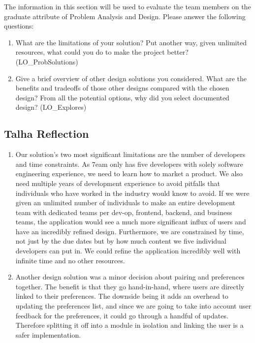 \documentclass[12pt, titlepage]{article}
\begin{document}
The information in this section will be used to evaluate the team members on the
graduate attribute of Problem Analysis and Design.  Please answer the following questions:

\begin{enumerate}
  \item What are the limitations of your solution?  Put another way, given
  unlimited resources, what could you do to make the project better? (LO\_ProbSolutions)
  \item Give a brief overview of other design solutions you considered.  What
  are the benefits and tradeoffs of those other designs compared with the chosen
  design?  From all the potential options, why did you select documented design?
  (LO\_Explores)
\end{enumerate}

\subsection{Talha Reflection}
\begin{enumerate}
	\item Our solution's two most significant limitations are the number of developers and time constraints. As 7eam only has five developers with solely software engineering experience, we need to learn how to market a product. We also need multiple years of development experience to avoid pitfalls that individuals who have worked in the industry would know to avoid. If we were given an unlimited number of individuals to make an entire development team with dedicated teams per dev-op, frontend, backend, and business teams, the application would see a much more significant influx of users and have an incredibly refined design. Furthermore, we are constrained by time, not just by the due dates but by how much content we five individual developers can put in. We could refine the application incredibly well with infinite time and no other resources.
	
	\item Another design solution was a minor decision about pairing and preferences together. The benefit is that they go hand-in-hand, where users are directly linked to their preferences. The downside being it adds an overhead to updating the preferences list, and since we are going to take into account user feedback for the preferences, it could go through a handful of updates. Therefore splitting it off into a module in isolation and linking the user is a safer implementation.
\end{enumerate}
\end{document}
